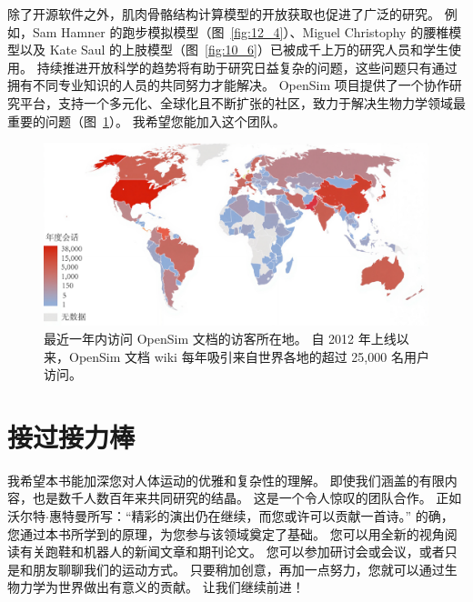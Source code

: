除了开源软件之外，肌肉骨骼结构计算模型的开放获取也促进了广泛的研究。
例如，Sam Hamner 的跑步模拟模型（图~\ref{fig:12_4}）、Miguel Christophy 的腰椎模型\cite{christophy2012musculoskeletal}以及 Kate Saul 的上肢模型（图~\ref{fig:10_6}）已被成千上万的研究人员和学生使用。
持续推进开放科学的趋势将有助于研究日益复杂的问题，这些问题只有通过拥有不同专业知识的人员的共同努力才能解决。
OpenSim 项目提供了一个协作研究平台，支持一个多元化、全球化且不断扩张的社区，致力于解决生物力学领域最重要的问题（图~\ref{fig:13_8}）。
我希望您能加入这个团队。


\begin{figure}[!htb]
	\centering
	\includegraphics[width=1.0\linewidth]{chap13/13_8}
	\caption{最近一年内访问 OpenSim 文档的访客所在地。
		自 2012 年上线以来，OpenSim 文档 wiki 每年吸引来自世界各地的超过 25,000 名用户访问\cite{seth2018opensim}。 \label{fig:13_8}}
\end{figure}


\section{接过接力棒}

我希望本书能加深您对人体运动的优雅和复杂性的理解。
即使我们涵盖的有限内容，也是数千人数百年来共同研究的结晶。
这是一个令人惊叹的团队合作。
正如沃尔特$\cdot$惠特曼所写：“精彩的演出仍在继续，而您或许可以贡献一首诗。” 
的确，您通过本书所学到的原理，为您参与该领域奠定了基础。
您可以用全新的视角阅读有关跑鞋和机器人的新闻文章和期刊论文。
您可以参加研讨会或会议，或者只是和朋友聊聊我们的运动方式。
只要稍加创意，再加一点努力，您就可以通过生物力学为世界做出有意义的贡献。
让我们继续前进！









